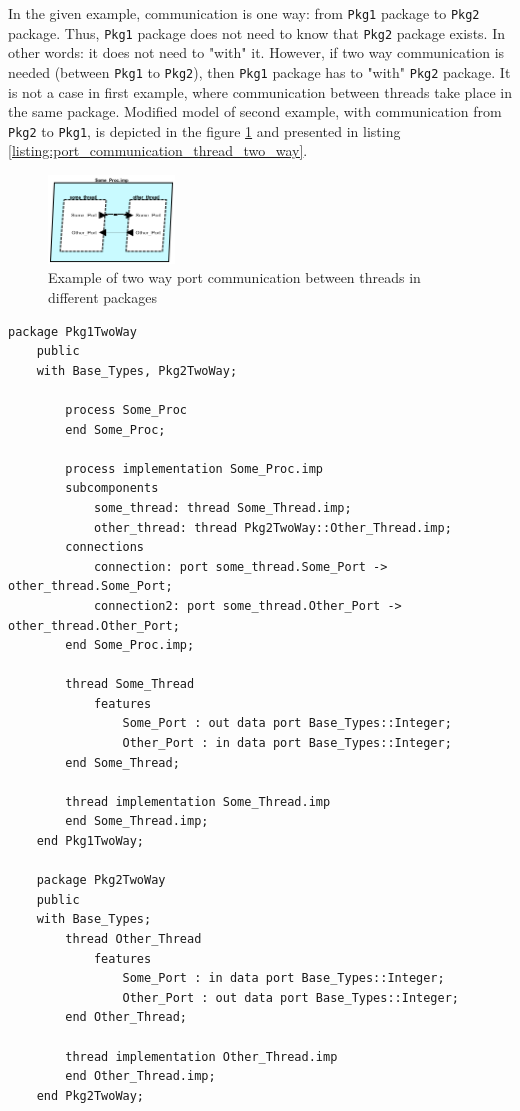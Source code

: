 In the given example, communication is one way: from \lstinline{Pkg1} package to \lstinline{Pkg2} package. Thus, \lstinline{Pkg1} package does not need to know that \lstinline{Pkg2} package exists. In other words: it does not need to "with" it. However, if two way communication is needed (between \lstinline{Pkg1} to \lstinline{Pkg2}), then \lstinline{Pkg1} package has to "with" \lstinline{Pkg2} package. It is not a case in first example, where communication between threads take place in the same package. Modified model of second example, with communication from \lstinline{Pkg2} to \lstinline{Pkg1}, is depicted in the figure \ref{figure:port_communication_thread_two_way} and presented in listing \ref{listing:port_communication_thread_two_way}. 

\begin{figure}[ht]%
    \begin{center}
    	\includegraphics[width=0.3\textwidth]{figures/port-communication-thread-two-way.png}
    	\caption{Example of two way port communication between threads in different packages}
    \end{center}
    \label{figure:port_communication_thread_two_way}
\end{figure}

\singlespacing
\begin{lstlisting}[language=aadl, frame=single, gobble=0, caption={AADL model of two way port communication threads in different packages}]
	package Pkg1TwoWay
	public
	with Base_Types, Pkg2TwoWay;

		process Some_Proc
		end Some_Proc;
		
		process implementation Some_Proc.imp
		subcomponents
			some_thread: thread Some_Thread.imp;
			other_thread: thread Pkg2TwoWay::Other_Thread.imp;
		connections
			connection: port some_thread.Some_Port -> other_thread.Some_Port;
			connection2: port some_thread.Other_Port -> other_thread.Other_Port;
		end Some_Proc.imp;

		thread Some_Thread
			features
				Some_Port : out data port Base_Types::Integer;
				Other_Port : in data port Base_Types::Integer;
		end Some_Thread;

		thread implementation Some_Thread.imp
		end Some_Thread.imp;	
	end Pkg1TwoWay;

	package Pkg2TwoWay
	public
	with Base_Types;
		thread Other_Thread
			features
				Some_Port : in data port Base_Types::Integer;
				Other_Port : out data port Base_Types::Integer;
		end Other_Thread;

		thread implementation Other_Thread.imp
		end Other_Thread.imp;
	end Pkg2TwoWay;
\end{lstlisting} 
\label{listing:port_communication_thread_two_way}
\doublespacing

